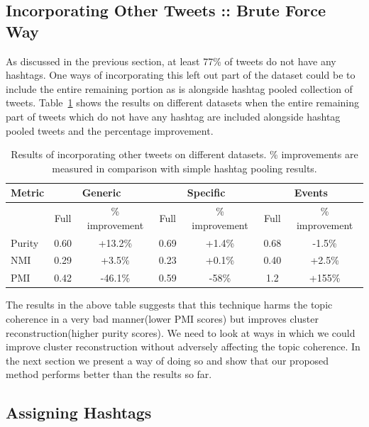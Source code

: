 \documentclass[10pt,a5paper,twoside]{article}
\begin{document}
\subsection{Incorporating Other Tweets :: Brute Force Way}

As discussed in the previous section, at least 77\% of tweets do not
have any hashtags. One ways of incorporating this left out part of the
dataset could be to include the entire remaining portion as is
alongside hashtag pooled collection of tweets. Table~\ref{tbl-8} shows
the results on different datasets when the entire remaining part of
tweets which do not have any hashtag are included alongside hashtag
pooled tweets and the percentage improvement.

\begin{table}[!h]
\centering
\resizebox{14cm}{!} 
{
	\begin{tabular}{|l|cc|cc|cc|}
	\hline
	Metric  & \multicolumn {2}{c}{Generic} & \multicolumn {2}{c}{Specific} & \multicolumn {2}{c|}{Events}\\
	\hline
	 & Full & \% improvement & Full & \% improvement & Full & \% improvement\\
	\hline
	Purity & 0.60 & +13.2\% & 0.69 & +1.4\% & 0.68 & -1.5\% \\
	\hline
	NMI & 0.29 & +3.5\% & 0.23 & +0.1\% & 0.40 & +2.5\% \\
	\hline
	PMI & 0.42 & -46.1\% & 0.59 & -58\% & 1.2 & +155\% \\
	\hline
	\end{tabular}
}
\caption{Results of incorporating other tweets on different datasets. \% improvements are measured in comparison with simple hashtag pooling results.}\label{tbl-8}
\end{table}

The results in the above table suggests that this technique harms the
topic coherence in a very bad manner(lower PMI scores) but improves
cluster reconstruction(higher purity scores). We need to look at ways
in which we could improve cluster reconstruction without adversely
affecting the topic coherence. In the next section we present a way of
doing so and show that our proposed method performs better than the
results so far.

\subsection{Assigning Hashtags}

\label{subsec:assign_hashtags}
\end{document}

